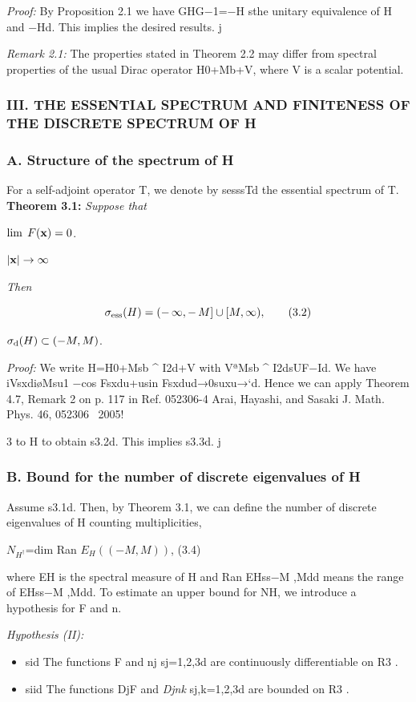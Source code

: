 \documentclass{article}
\begin{document}
\textit{Proof:} By Proposition 2.1 we have GHG−1=−H sthe unitary equivalence of H and −Hd. This implies the desired results. j

\textit{Remark 2.1:} The properties stated in Theorem 2.2 may differ from spectral properties of the usual Dirac operator H0+Mb+V, where V is a scalar potential.

\subsubsection{\textbf{III. THE ESSENTIAL SPECTRUM AND FINITENESS OF THE DISCRETE SPECTRUM} OF H}

\subsubsection{\textbf{A. Structure of the spectrum of} H}

For a self-adjoint operator T, we denote by sesssTd the essential spectrum of T. \textbf{Theorem 3.1:} \textit{Suppose that}

$\lim\;F({\bf x})=0$.

$|{\bf x}|\rightarrow\infty$

\textit{Then}

$$\sigma_{\rm ess}(H)=(-\,\infty,-\,M]\cup[M,\infty),\tag{3.2}$$

$\sigma_{\rm d}(H)\subset(-M,M)$.

\textit{Proof:} We write H=H0+Msb ^ I2d+V with VªMsb ^ I2dsUF−Id. We have iVsxdiøMsu1 −cos Fsxdu+usin Fsxdud→0suxu→`d. Hence we can apply Theorem 4.7, Remark 2 on p. 117 in Ref. 052306-4 Arai, Hayashi, and Sasaki J. Math. Phys. 46, 052306 ~2005!

3 to H to obtain s3.2d. This implies s3.3d. j

\subsubsection{\textbf{B. Bound for the number of discrete eigenvalues of} H}

Assume s3.1d. Then, by Theorem 3.1, we can define the number of discrete eigenvalues of H counting multiplicities,

$N_{H^{\dagger}}$=dim Ran $E_{H}((-M,M))$, (3.4)

where EH is the spectral measure of H and Ran EHss−M ,Mdd means the range of EHss−M ,Mdd. To estimate an upper bound for NH, we introduce a hypothesis for F and n.

\textit{Hypothesis (II):}
\begin{itemize}
\item 
sid The functions F and nj sj=1,2,3d are continuously differentiable on R3 .

\item 
siid The functions DjF and \textit{Djnk} sj,k=1,2,3d are bounded on R3 .

\end{itemize}
\end{document}
